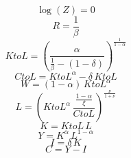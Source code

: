 \begin{dmath}
\log(Z) = 0
\end{dmath}
\begin{dmath}
R = \frac{1}{{\beta}}
\end{dmath}
\begin{dmath}
KtoL = \left(\frac{{\alpha}}{\frac{1}{{\beta}}-\left(1-{\delta}\right)}\right)^{\frac{1}{1-{\alpha}}}
\end{dmath}
\begin{dmath}
CtoL = {KtoL}^{{\alpha}}-{\delta}\, {KtoL}
\end{dmath}
\begin{dmath}
W = \left(1-{\alpha}\right)\, {KtoL}^{{\alpha}}
\end{dmath}
\begin{dmath}
L = \left({KtoL}^{{\alpha}}\, \frac{\frac{1-{\alpha}}{{\xi}}}{{CtoL}}\right)^{\frac{{\nu}}{1+{\nu}}}
\end{dmath}
\begin{dmath}
K = {KtoL}\, {L}
\end{dmath}
\begin{dmath}
Y = {K}^{{\alpha}}\, {L}^{1-{\alpha}}
\end{dmath}
\begin{dmath}
I = {\delta}\, {K}
\end{dmath}
\begin{dmath}
C = {Y}-{I}
\end{dmath}
